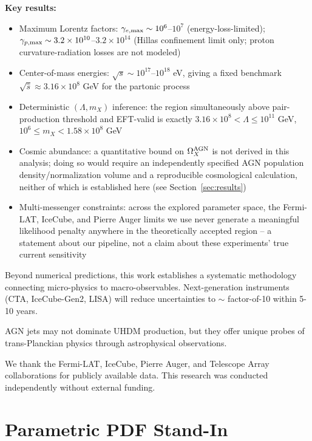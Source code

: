 \documentclass[twocolumn,superscriptaddress,prd,nofootinbib]{revtex4-2}
\begin{document}
\textbf{Key results:}
\begin{itemize}
\item Maximum Lorentz factors: $\gamma_{e,\rm max} \sim 10^6$--$10^7$ (energy-loss-limited); $\gamma_{p,\rm max} \sim 3.2\times10^{10}$--$3.2\times10^{14}$ (Hillas confinement limit only; proton curvature-radiation losses are not modeled)
\item Center-of-mass energies: $\sqrt{s} \sim 10^{17}$--$10^{18}$ eV, giving a fixed benchmark $\sqrt{\hat{s}} \approx 3.16\times10^8$ GeV for the partonic process
\item Deterministic $(\Lambda, m_X)$ inference: the region simultaneously above pair-production threshold and EFT-valid is exactly $3.16\times10^8 < \Lambda \le 10^{11}$ GeV, $10^6 \le m_X < 1.58\times10^8$ GeV
\item Cosmic abundance: a quantitative bound on $\Omega_X^{\rm AGN}$ is not derived in this analysis; doing so would require an independently specified AGN population density/normalization volume and a reproducible cosmological calculation, neither of which is established here (see Section~\ref{sec:results})
\item Multi-messenger constraints: across the explored parameter space, the Fermi-LAT, IceCube, and Pierre Auger limits we use never generate a meaningful likelihood penalty anywhere in the theoretically accepted region -- a statement about our pipeline, not a claim about these experiments' true current sensitivity
\end{itemize}

Beyond numerical predictions, this work establishes a systematic methodology connecting micro-physics to macro-observables. Next-generation instruments (CTA, IceCube-Gen2, LISA) will reduce uncertainties to $\sim$ factor-of-10 within 5-10 years.

AGN jets may not dominate UHDM production, but they offer unique probes of trans-Planckian physics through astrophysical observations.

\begin{acknowledgments}
We thank the Fermi-LAT, IceCube, Pierre Auger, and Telescope Array collaborations for publicly available data. This research was conducted independently without external funding.
\end{acknowledgments}




\appendix

\section{Parametric PDF Stand-In}
\label{app:pdf}
\end{document}
